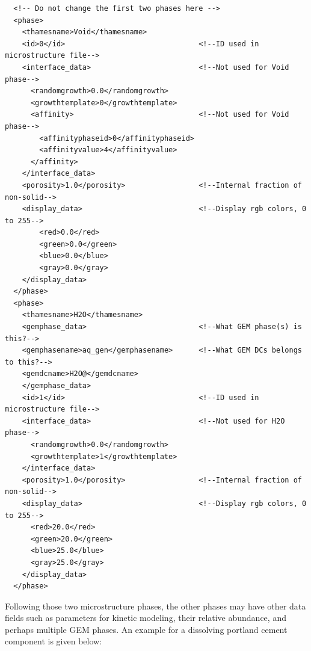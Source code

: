 \documentclass{article}
\begin{document}
\scriptsize{
    \begin{lstlisting}
  <!-- Do not change the first two phases here -->
  <phase>
    <thamesname>Void</thamesname>
    <id>0</id>                               <!--ID used in microstructure file-->
    <interface_data>                         <!--Not used for Void phase-->
      <randomgrowth>0.0</randomgrowth>       
      <growthtemplate>0</growthtemplate>
      <affinity>                             <!--Not used for Void phase-->
        <affinityphaseid>0</affinityphaseid>
        <affinityvalue>4</affinityvalue>
      </affinity>
    </interface_data>
    <porosity>1.0</porosity>                 <!--Internal fraction of non-solid-->
    <display_data>                           <!--Display rgb colors, 0 to 255-->
        <red>0.0</red>
        <green>0.0</green>
        <blue>0.0</blue>
        <gray>0.0</gray>
    </display_data>
  </phase>
  <phase>
    <thamesname>H2O</thamesname>             
    <gemphase_data>                          <!--What GEM phase(s) is this?-->
    <gemphasename>aq_gen</gemphasename>      <!--What GEM DCs belongs to this?-->
    <gemdcname>H2O@</gemdcname>
    </gemphase_data>
    <id>1</id>                               <!--ID used in microstructure file-->
    <interface_data>                         <!--Not used for H2O phase-->
      <randomgrowth>0.0</randomgrowth>
      <growthtemplate>1</growthtemplate>
    </interface_data>
    <porosity>1.0</porosity>                 <!--Internal fraction of non-solid-->
    <display_data>                           <!--Display rgb colors, 0 to 255-->
      <red>20.0</red>
      <green>20.0</green>
      <blue>25.0</blue>
      <gray>25.0</gray>
    </display_data>
  </phase>
    \end{lstlisting}
}


Following those two microstructure phases, the other phases may have other data fields
such as parameters for kinetic modeling, their relative abundance, and perhaps
multiple GEM phases.  An example for a dissolving portland cement component is
given below:
\end{document}
